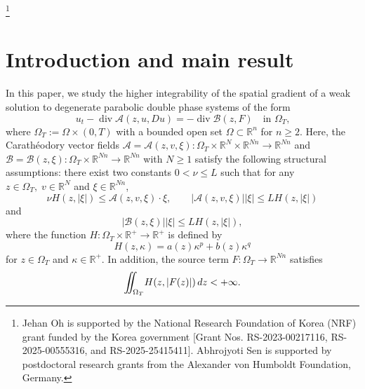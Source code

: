 \documentclass[11pt,oneside, english,reqno,twoside a4paper]{amsart}
\theoremstyle{definition}
\numberwithin{theorem}{section}
\numberwithin{equation}{section}
\newcommand{\aaa}{{\mathcal{A}}}  %
\newcommand{ \mr }{ \mathbb{R} }
\newcommand{\iints}[1]{{\int\hspace{-0.28cm}\int_{#1}}}
\begin{document}
%
%
\thanks{Jehan Oh is supported by the National Research Foundation of Korea (NRF) grant funded by the Korea government [Grant Nos. RS-2023-00217116, RS-2025-00555316, and RS-2025-25415411]. Abhrojyoti Sen is supported by postdoctoral research grants from the Alexander von Humboldt Foundation, Germany.}


\maketitle
\tableofcontents

\section{Introduction and main result}


In this paper, we study the higher integrability of the spatial gradient of a weak solution to degenerate parabolic double phase systems of the form
\begin{equation}    \label{eq: main equation}
    u_t -\operatorname*{div}\mathcal{A}(z,u,Du)=-\operatorname*{div}\mathcal{B}(z,F) \quad \text{in $\Omega_T$,}
\end{equation}
where $\Omega_T:=\Omega\times (0,T)$ with a bounded open set $\Omega \subset \mr^n$ for $n\geq 2$.
Here, the Carath\'{e}odory vector fields $\aaa=\aaa(z, v, \xi):\Omega_T\times \mathbb{R}^N \times \mathbb{R}^{Nn} \to \mathbb{R}^{Nn}$ and $\mathcal{B}=\mathcal{B}(z, \xi):\Omega_T \times \mathbb{R}^{Nn}\to \mathbb{R}^{Nn}$ with $N\geq 1$ satisfy the following structural assumptions: there exist two constants $0<\nu\leq L$ such that for any $z \in \Omega_T, \; v\in \mr^N$ and $\xi\in \mr^{Nn}$,
\begin{equation}    \label{eq: growth condition of A}
    \nu H(z,|\xi|)\leq \mathcal{A}(z,v,\xi)\cdot \xi, \qquad |\mathcal{A}(z,v,\xi)||\xi|\leq LH(z,|\xi|)
\end{equation}
and
\begin{equation}    \label{eq: growth condition of B}
    |\mathcal{B}(z,\xi)||\xi|\leq LH(z,|\xi|),
\end{equation}
where the function $H:\Omega_T\times  \mr^+\rightarrow \mr^+$ is defined by 
$$
H(z,\kappa)=a(z)\kappa^p+b(z)\kappa^q
$$
for $z\in\Omega_T$ and $\kappa\in\mr^+$.  
In addition, the source term $F:\Omega_T\rightarrow \mr^{Nn}$ satisfies 
\begin{equation}    \label{eq: assumption of F}
    \iints{\Omega_T} H(z,|F(z)|)\,dz < +\infty.
\end{equation}
\end{document}
